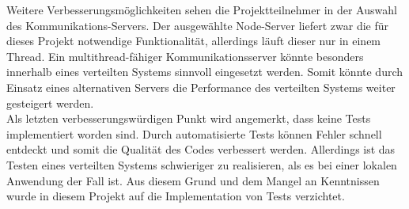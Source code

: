 Weitere Verbesserungsmöglichkeiten sehen die Projektteilnehmer in der Auswahl des Kommunikations-Servers. Der ausgewählte Node-Server liefert zwar die für dieses Projekt notwendige Funktionalität, allerdings läuft dieser nur in einem Thread. Ein multithread-fähiger Kommunikationsserver könnte besonders innerhalb eines verteilten Systems sinnvoll eingesetzt werden. Somit könnte durch Einsatz eines alternativen Servers die Performance des verteilten Systems weiter gesteigert werden. \\

Als letzten verbesserungswürdigen Punkt wird angemerkt, dass keine Tests implementiert worden sind. Durch automatisierte Tests können Fehler schnell entdeckt und somit die Qualität des Codes verbessert werden. Allerdings ist das Testen eines verteilten Systems schwieriger zu realisieren, als es bei einer lokalen Anwendung der Fall ist. Aus diesem Grund und dem Mangel an Kenntnissen wurde in diesem Projekt auf die Implementation von Tests verzichtet. 


